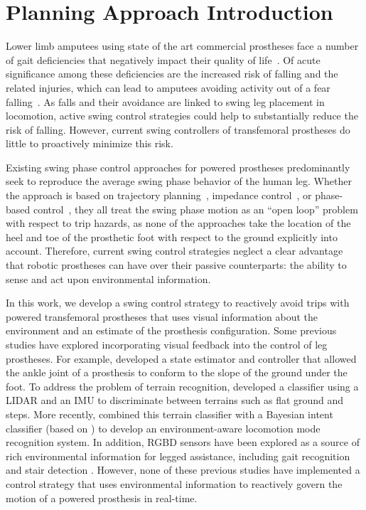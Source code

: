 \section{Planning Approach Introduction}\label{sec:swing_control_planning}
Lower limb amputees using state of the art commercial prostheses face a number
of gait deficiencies that negatively impact their quality of
life~\citep{gauthier1999enabling}. Of acute significance among these
deficiencies are the increased risk of falling and the related injuries, which
can lead to amputees avoiding activity out of a fear
falling~\citep{miller2001prevalence}.  As falls and their avoidance are linked
to swing leg placement in locomotion, active swing control strategies could help
to substantially reduce the risk of falling. However, current swing controllers
of transfemoral prostheses do little to proactively minimize this risk. 

Existing swing phase control approaches for powered prostheses predominantly
seek to reproduce the average swing phase behavior of the human leg. Whether the
approach is based on trajectory planning~\citep{lenzi2014speed}, impedance
control~\citep{sup2009preliminary}, or phase-based
control~\citep{quintero2016preliminary}, they all treat the swing phase motion
as an ``open loop'' problem with respect to trip hazards, as none of the
approaches take the location of the heel and toe of the prosthetic foot with
respect to the ground explicitly into account. Therefore, current swing control
strategies neglect a clear advantage that robotic prostheses can have over their
passive counterparts: the ability to sense and act upon environmental
information. 

In this work, we develop a swing control strategy to reactively avoid trips with
powered transfemoral prostheses that uses visual information about the
environment and an estimate of the prosthesis configuration. Some previous
studies have explored incorporating visual feedback into the control of leg
prostheses. For example, \citet{scandaroli2009estimation} developed a state
estimator and controller that allowed the ankle joint of a prosthesis to conform
to the slope of the ground under the foot. To address the problem of terrain
recognition, \citet{zhang2011preliminary} developed a classifier using a LIDAR
and an IMU to discriminate between terrains such as flat ground and steps. More
recently, \citet{liu2016development} combined this terrain classifier with a
Bayesian intent classifier (based on \citep{du2012toward}) to develop an
environment-aware locomotion mode recognition system. In addition, RGBD sensors
have been explored as a source of rich environmental information for legged
assistance, including gait recognition \citep{massalin2017user} and stair
detection \citep{krausz2015depth,duan2018real}. However, none of these previous
studies have implemented a control strategy that uses environmental
information to reactively govern the motion of a powered prosthesis in
real-time. 

